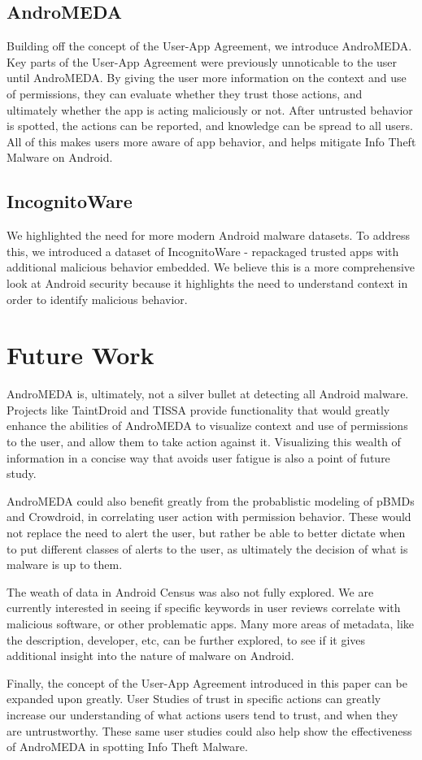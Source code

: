 \subsection{AndroMEDA}
Building off the concept of the User-App Agreement, we introduce AndroMEDA. Key parts of the User-App Agreement were previously unnoticable to the user until AndroMEDA. By giving the user more information on the context and use of permissions, they can evaluate whether they trust those actions, and ultimately whether the app is acting maliciously or not. After untrusted behavior is spotted, the actions can be reported, and knowledge can be spread to all users. All of this makes users more aware of app behavior, and helps mitigate Info Theft Malware on Android.

\subsection{IncognitoWare}
We highlighted the need for more modern Android malware datasets. To address this, we introduced a dataset of IncognitoWare - repackaged trusted apps with additional malicious behavior embedded. We believe this is a more comprehensive look at Android security because it highlights the need to understand context in order to identify malicious behavior.

\section{Future Work}
\label{sec:futurework}
AndroMEDA is, ultimately, not a silver bullet at detecting all Android malware. Projects like TaintDroid and TISSA provide functionality that would greatly enhance the abilities of AndroMEDA to visualize context and use of permissions to the user, and allow them to take action against it. Visualizing this wealth of information in a concise way that avoids user fatigue is also a point of future study.

AndroMEDA could also benefit greatly from the probablistic modeling of pBMDs and Crowdroid, in correlating user action with permission behavior. These would not replace the need to alert the user, but rather be able to better dictate when to put different classes of alerts to the user, as ultimately the decision of what is malware is up to them.

The weath of data in Android Census was also not fully explored. We are currently interested in seeing if specific keywords in user reviews correlate with malicious software, or other problematic apps. Many more areas of metadata, like the description, developer, etc, can be further explored, to see if it gives additional insight into the nature of malware on Android.

Finally, the concept of the User-App Agreement introduced in this paper can be expanded upon greatly. User Studies of trust in specific actions can greatly increase our understanding of what actions users tend to trust, and when they are untrustworthy. These same user studies could also help show the effectiveness of AndroMEDA in spotting Info Theft Malware.